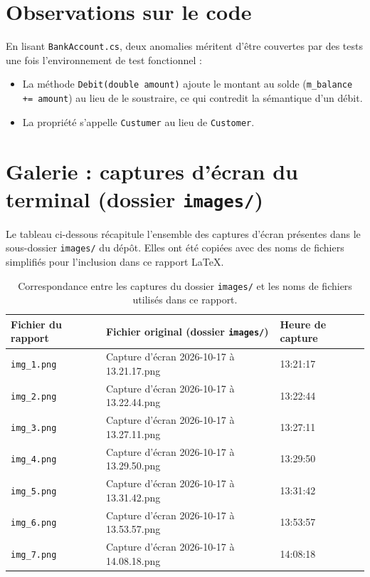 \documentclass[11pt,a4paper]{article}
\begin{document}
\section{Observations sur le code}

En lisant \texttt{BankAccount.cs}, deux anomalies méritent d'être couvertes par des tests une fois l'environnement de test fonctionnel :

\begin{itemize}[leftmargin=*]
  \item La méthode \texttt{Debit(double amount)} ajoute le montant au solde (\texttt{m\_balance += amount}) au lieu de le soustraire, ce qui contredit la sémantique d'un débit.
  \item La propriété s'appelle \texttt{Custumer} au lieu de \texttt{Customer}.
\end{itemize}

\section{Galerie : captures d'écran du terminal (dossier \texttt{images/})}

Le tableau ci-dessous récapitule l'ensemble des captures d'écran présentes dans le sous-dossier \texttt{images/} du dépôt. Elles ont été copiées avec des noms de fichiers simplifiés pour l'inclusion dans ce rapport LaTeX.

\begin{table}[h]
\centering
\small
\begin{tabular}{@{}lll@{}}
\toprule
\textbf{Fichier du rapport} & \textbf{Fichier original (dossier \texttt{images/})} & \textbf{Heure de capture} \\
\midrule
\texttt{img\_1.png} & Capture d'écran 2026-10-17 à 13.21.17.png & 13:21:17 \\
\texttt{img\_2.png} & Capture d'écran 2026-10-17 à 13.22.44.png & 13:22:44 \\
\texttt{img\_3.png} & Capture d'écran 2026-10-17 à 13.27.11.png & 13:27:11 \\
\texttt{img\_4.png} & Capture d'écran 2026-10-17 à 13.29.50.png & 13:29:50 \\
\texttt{img\_5.png} & Capture d'écran 2026-10-17 à 13.31.42.png & 13:31:42 \\
\texttt{img\_6.png} & Capture d'écran 2026-10-17 à 13.53.57.png & 13:53:57 \\
\texttt{img\_7.png} & Capture d'écran 2026-10-17 à 14.08.18.png & 14:08:18 \\
\bottomrule
\end{tabular}
\caption{Correspondance entre les captures du dossier \texttt{images/} et les noms de fichiers utilisés dans ce rapport.}
\label{tab:captures}
\end{table}
\end{document}
